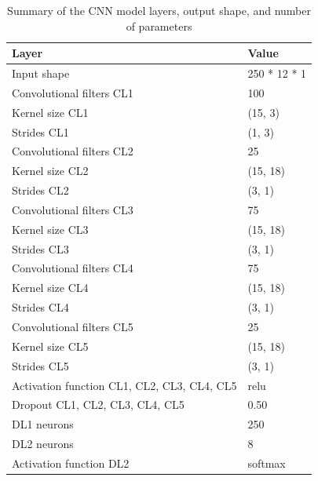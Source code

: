 \documentclass[journal,article,submit,moreauthors,pdftex]{Definitions/mdpi}
\newcommand{\hosein}[1]{\textcolor{orange}{{\it [Hosein: #1]}}}
\begin{document}
\begin{table}[H]
	\caption{Summary of the CNN model layers, output shape, and number of parameters }
	\centering
	\begin{tabular}{p{8cm}p{3cm}}
		\toprule
		\textbf{Layer} & \textbf{Value}  \\
		\midrule	
		Input shape &  250 * 12 * 1 \\
		Convolutional filters CL1 &  100 \\
		Kernel size CL1 &  (15, 3) \\
		Strides CL1 &  (1, 3) \\
		Convolutional filters CL2 &  25 \\
		Kernel size CL2 &  (15, 18) \\
		Strides CL2 &  (3, 1) \\
		Convolutional filters CL3 &  75 \\
		Kernel size CL3 &  (15, 18) \\
		Strides CL3 &  (3, 1) \\
		Convolutional filters CL4 &  75 \\
		Kernel size CL4 &  (15, 18) \\
		Strides CL4 &  (3, 1) \\
		Convolutional filters CL5 &  25 \\
		Kernel size CL5 &  (15, 18) \\
		Strides CL5 & (3, 1)  \\
		Activation function CL1, CL2, CL3, CL4, CL5 &  relu   \\
		Dropout CL1, CL2, CL3, CL4, CL5 & 0.50 \\
		DL1 neurons & 250  \\
		DL2 neurons & 8 \\
		Activation function DL2 &  softmax \\
		
		\bottomrule
	\end{tabular}
	\label{Table:CNN_network}
\end{table}

\end{document}
